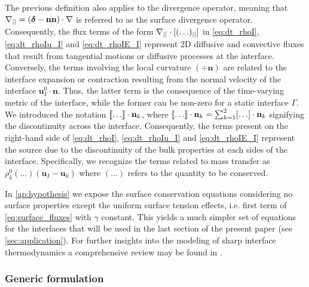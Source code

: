 The previous definition also applies to the divergence operator, meaning that $\mathbf{\nabla}_{||}= (\bm\delta-\textbf{nn})\cdot \mathbf{\nabla}$ is referred to as the surface divergence operator. 
Consequently, the flux terms of the form $\mathbf{\nabla}_{||}\cdot[(\ldots)_{||}]$ in \ref{eq:dt_rhoI}, \ref{eq:dt_rhoIu_I} and \ref{eq:dt_rhoIE_I} represent 2D diffusive and convective fluxes that result from tangential motions or diffusive processes at the interface. 
Conversely, the terms involving the local curvature $(\div \textbf{n})$ are related to the interface expansion or contraction resulting from the normal velocity of the interface $\textbf{u}_I^0\cdot \textbf{n}$. 
Thus, the latter term is the consequence of the time-varying metric of the interface, while the former can be non-zero for a static interface $\Gamma$. 
We introduced the notation $\llbracket \ldots \rrbracket \cdot \textbf{n}_k$, where $\llbracket \ldots \rrbracket \cdot \textbf{n}_k = \sum_{k=1}^2 [\ldots] \cdot \textbf{n}_k$ signifying the discontinuity across the interface.
Consequently, the terms present on the right-hand side of \ref{eq:dt_rhoI}, \ref{eq:dt_rhoIu_I} and \ref{eq:dt_rhoIE_I} represent the source due to the discontinuity of the bulk properties at each sides of the interface. 
Specifically, we recognize the terms related to mass transfer as $\rho_k^0 (\ldots) (\textbf{u}_I - \textbf{u}_k)$ where $(\ldots)$ refers to the quantity to be conserved. 


In \ref{ap:hypothesis} we expose the surface conservation equations considering no surface properties except the uniform surface tension effects, i.e. first term of \ref{eq:surface_fluxes} with $\gamma$ constant. 
This yields a much simpler set of equations for the interfaces that will be used in the last section of the present paper (see \ref{sec:application}). 
For further insights into the modeling of sharp interface thermodynamics a comprehensive review may be found in \cite{bothe2022sharp}. 

\subsubsection{Generic formulation}

